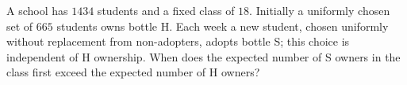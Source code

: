 A school has $1434$ students and a fixed class of $18$. Initially a uniformly chosen set of $665$ students owns bottle H. Each week a new student, chosen uniformly without replacement from non-adopters, adopts bottle S; this choice is independent of H ownership. When does the expected number of S owners in the class first exceed the expected number of H owners?
